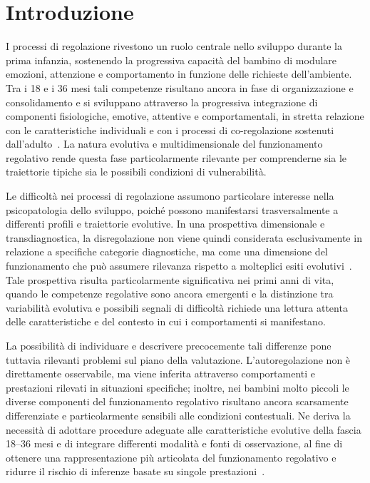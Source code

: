 \chapter*{Introduzione}
\label{cap:introduzione}
\pagestyle{plain}

I processi di regolazione rivestono un ruolo centrale nello sviluppo durante la prima infanzia, sostenendo la progressiva capacità del bambino di modulare emozioni, attenzione e comportamento in funzione delle richieste dell'ambiente. Tra i 18 e i 36 mesi tali competenze risultano ancora in fase di organizzazione e consolidamento e si sviluppano attraverso la progressiva integrazione di componenti fisiologiche, emotive, attentive e comportamentali, in stretta relazione con le caratteristiche individuali e con i processi di co-regolazione sostenuti dall'adulto~\cite{calkins2007,blair2015}. La natura evolutiva e multidimensionale del funzionamento regolativo rende questa fase particolarmente rilevante per comprenderne sia le traiettorie tipiche sia le possibili condizioni di vulnerabilità.

Le difficoltà nei processi di regolazione assumono particolare interesse nella psicopatologia dello sviluppo, poiché possono manifestarsi trasversalmente a differenti profili e traiettorie evolutive. In una prospettiva dimensionale e transdiagnostica, la disregolazione non viene quindi considerata esclusivamente in relazione a specifiche categorie diagnostiche, ma come una dimensione del funzionamento che può assumere rilevanza rispetto a molteplici esiti evolutivi~\cite{beauchaine2019,astle2022}. Tale prospettiva risulta particolarmente significativa nei primi anni di vita, quando le competenze regolative sono ancora emergenti e la distinzione tra variabilità evolutiva e possibili segnali di difficoltà richiede una lettura attenta delle caratteristiche e del contesto in cui i comportamenti si manifestano.

La possibilità di individuare e descrivere precocemente tali differenze pone tuttavia rilevanti problemi sul piano della valutazione. L'autoregolazione non è direttamente osservabile, ma viene inferita attraverso comportamenti e prestazioni rilevati in situazioni specifiche; inoltre, nei bambini molto piccoli le diverse componenti del funzionamento regolativo risultano ancora scarsamente differenziate e particolarmente sensibili alle condizioni contestuali. Ne deriva la necessità di adottare procedure adeguate alle caratteristiche evolutive della fascia 18--36 mesi e di integrare differenti modalità e fonti di osservazione, al fine di ottenere una rappresentazione più articolata del funzionamento regolativo e ridurre il rischio di inferenze basate su singole prestazioni~\cite{mcclelland2012,snyder2021}.

